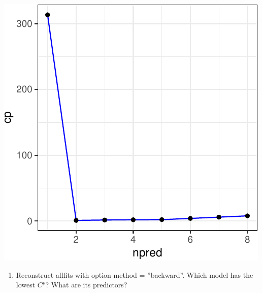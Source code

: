\documentclass[]{article}
\newenvironment{Shaded}{\begin{snugshade}}{\end{snugshade}}
\newcommand{\DataTypeTok}[1]{\textcolor[rgb]{0.13,0.29,0.53}{#1}}
\newcommand{\DecValTok}[1]{\textcolor[rgb]{0.00,0.00,0.81}{#1}}
\newcommand{\KeywordTok}[1]{\textcolor[rgb]{0.13,0.29,0.53}{\textbf{#1}}}
\newcommand{\NormalTok}[1]{#1}
\newcommand{\OperatorTok}[1]{\textcolor[rgb]{0.81,0.36,0.00}{\textbf{#1}}}
\newcommand{\StringTok}[1]{\textcolor[rgb]{0.31,0.60,0.02}{#1}}
\providecommand{\tightlist}{%
  \setlength{\itemsep}{0pt}\setlength{\parskip}{0pt}}
\begin{document}
\begin{Shaded}
\end{Shaded}

\begin{center}\includegraphics{sol_A3_files/figure-latex/unnamed-chunk-24-2} \end{center}

\begin{enumerate}
\def\labelenumi{(\alph{enumi})}
\setcounter{enumi}{3}
\tightlist
\item
  Reconstruct allfits with option method = ''backward''. Which model has
  the lowest \(C^p\)? What are its predictors?
\end{enumerate}
\end{document}
